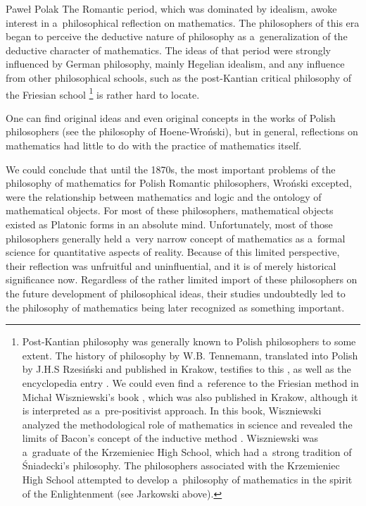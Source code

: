 \begin{artengenv}{Paweł Polak}
The Romantic period, which was dominated by idealism, awoke interest in a~philosophical reflection on mathematics. The philosophers of this era began to perceive the deductive nature of philosophy as a~generalization of the deductive character of mathematics. The ideas of that period were strongly influenced by German philosophy, mainly Hegelian idealism, and any influence from other philosophical schools, such as the post-Kantian critical philosophy of the Friesian school
\parencite[see e.g.][]{pulte_j_2013}%
\footnote{Post-Kantian philosophy was generally known to Polish philosophers to some extent. The history of philosophy by W.B. Tennemann, translated into Polish by J.H.S Rzesiński and published in Krakow, testifies to this 
\parencite[][pp.184–189]{rzesinski_w_1837}, %
 as well as the encyclopedia entry 
\parencite[][]{noauthor_fries_1862}. %
 We could even find a~reference to the Friesian method in Michał Wiszniewski's book 
\parencite[][pp.169–170]{wiszniewski_bakona_1834}, %
 which was also published in Krakow, although it is interpreted as a~pre-positivist approach. In this book, Wiszniewski analyzed the methodological role of mathematics in science and revealed the limits of Bacon's concept of the inductive method 
\parencite[][pp.131–139]{wiszniewski_bakona_1834}. %
 Wiszniewski was a~graduate of the Krzemieniec High School, which had a~strong tradition of Śniadecki's philosophy. The philosophers associated with the Krzemieniec High School attempted to develop a~philosophy of mathematics in the spirit of the Enlightenment (see Jarkowski above).} is rather hard to locate.

One can find original ideas and even original concepts in the works of Polish philosophers (see the philosophy of Hoene-Wroński), but in general, reflections on mathematics had little to do with the practice of mathematics itself.

We could conclude that until the 1870s, the most important problems of the philosophy of mathematics for Polish Romantic philosophers, Wroński excepted, were the relationship between mathematics and logic and the ontology of mathematical objects. For most of these philosophers, mathematical objects existed as Platonic forms in an absolute mind. Unfortunately, most of those philosophers generally held a~very narrow concept of mathematics as a~formal science for quantitative aspects of reality. Because of this limited perspective, their reflection was unfruitful and uninfluential, and it is of merely historical significance now. Regardless of the rather limited import of these philosophers on the future development of philosophical ideas, their studies undoubtedly led to the philosophy of mathematics being later recognized as something important.


\end{artengenv}
